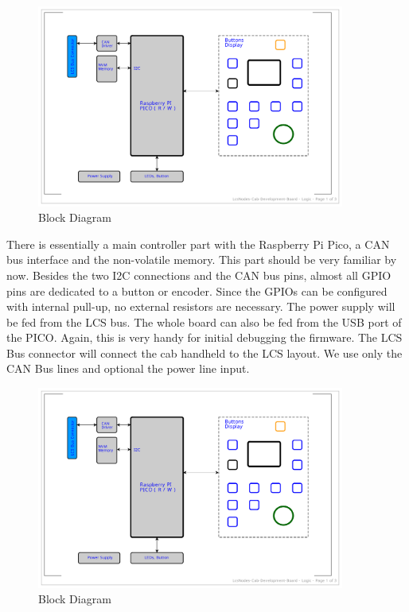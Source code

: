 \begin{figure}[htbp]
    \centering
    \includegraphics[page=1, width=0.9\textwidth]{./Schematics/Schematic_LcsNodes-Cab-Dev.pdf}
    \caption{Block Diagram}
\end{figure}
\FloatBarrier

There is essentially a main controller part with the Raspberry Pi Pico, a CAN bus interface and the non-volatile memory. This part should be very familiar by now. Besides the two I2C connections and the CAN bus pins, almost all GPIO pins are dedicated to a button or encoder. Since the GPIOs can be configured with internal pull-up, no external resistors are necessary. The power supply will be fed from the LCS bus. The whole board can also be fed from the USB port of the PICO. Again, this is very handy for initial debugging the firmware. The LCS Bus connector will connect the cab handheld to the LCS layout. We use only the CAN Bus lines and optional the power line input.

\begin{figure}[htbp]
    \centering
    \includegraphics[page=2, width=0.9\textwidth]{./Schematics/Schematic_LcsNodes-Cab-Dev.pdf}
    \caption{Block Diagram}
\end{figure}
\FloatBarrier

